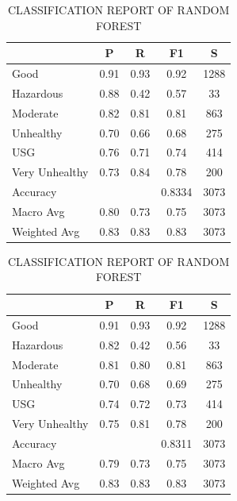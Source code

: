 \documentclass[a4paper,fleqn]{cas-dc}
\begin{document}
\vspace{1cm}
\begin{table}[h!]
\centering
\begin{minipage}{0.48\textwidth}
\centering
\caption{CLASSIFICATION REPORT OF XGBOOST CLASSIFIER}
\label{tab:xgboost_details}
\begin{tabular}{|l|c|c|c|c|}
\hline
 & \textbf{P} & \textbf{R} & \textbf{F1} & \textbf{S} \\
\hline
Good & 0.91 & 0.93 & 0.92 & 1288 \\
Hazardous & 0.88 & 0.42 & 0.57 & 33 \\
Moderate & 0.82 & 0.81 & 0.81 & 863 \\
Unhealthy & 0.70 & 0.66 & 0.68 & 275 \\
USG & 0.76 & 0.71 & 0.74 & 414 \\
Very Unhealthy & 0.73 & 0.84 & 0.78 & 200 \\
\hline
Accuracy &  &  & 0.8334 & 3073 \\
Macro Avg & 0.80 & 0.73 & 0.75 & 3073 \\
Weighted Avg & 0.83 & 0.83 & 0.83 & 3073 \\
\hline
\end{tabular}
\end{minipage}
\hfill
\begin{minipage}{0.48\textwidth}
\centering
\caption{CLASSIFICATION REPORT OF RANDOM FOREST}
\label{tab:rf_details}
\begin{tabular}{|l|c|c|c|c|}
\hline
 & \textbf{P} & \textbf{R} & \textbf{F1} & \textbf{S} \\
\hline
Good & 0.91 & 0.93 & 0.92 & 1288 \\
Hazardous & 0.82 & 0.42 & 0.56 & 33 \\
Moderate & 0.81 & 0.80 & 0.81 & 863 \\
Unhealthy & 0.70 & 0.68 & 0.69 & 275 \\
USG & 0.74 & 0.72 & 0.73 & 414 \\
Very Unhealthy & 0.75 & 0.81 & 0.78 & 200 \\
\hline
Accuracy &  &  & 0.8311 & 3073 \\
Macro Avg & 0.79 & 0.73 & 0.75 & 3073 \\
Weighted Avg & 0.83 & 0.83 & 0.83 & 3073 \\
\hline
\end{tabular}
\end{minipage}
\end{table}
\end{document}
